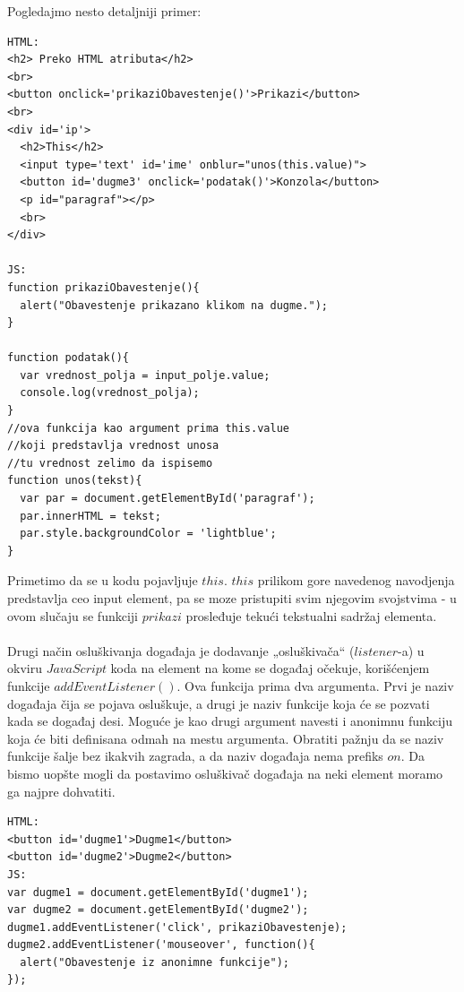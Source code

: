  
Pogledajmo nesto detaljniji primer:
\begin{lstlisting}[backgroundcolor = \color{lightgray}, breaklines=true]
HTML:
<h2> Preko HTML atributa</h2>
<br>
<button onclick='prikaziObavestenje()'>Prikazi</button>
<br>
<div id='ip'>
  <h2>This</h2>
  <input type='text' id='ime' onblur="unos(this.value)">
  <button id='dugme3' onclick='podatak()'>Konzola</button>
  <p id="paragraf"></p>
  <br>
</div>

JS:
function prikaziObavestenje(){
  alert("Obavestenje prikazano klikom na dugme.");
}

function podatak(){
  var vrednost_polja = input_polje.value;
  console.log(vrednost_polja);    
}
//ova funkcija kao argument prima this.value 
//koji predstavlja vrednost unosa
//tu vrednost zelimo da ispisemo
function unos(tekst){
  var par = document.getElementById('paragraf');
  par.innerHTML = tekst;
  par.style.backgroundColor = 'lightblue';
}           
\end{lstlisting} 

Primetimo da se u kodu pojavljuje $this$. $this$ prilikom gore navedenog navodjenja predstavlja ceo input element, pa se moze pristupiti svim njegovim svojstvima - u ovom slučaju se funkciji $prikazi$ prosleđuje tekući tekstualni sadržaj elementa.\\\\

Drugi način osluškivanja događaja je dodavanje „osluškivača“ ($listener$-a) u okviru
$JavaScript$ koda na element na kome se događaj očekuje, korišćenjem funkcije
$addEventListener()$. Ova funkcija prima dva argumenta. Prvi je naziv događaja čija se
pojava osluškuje, a drugi je naziv funkcije koja će se pozvati kada se događaj desi. Moguće je kao drugi argument navesti i anonimnu funkciju koja će biti definisana odmah na mestu argumenta. Obratiti pažnju da se naziv funkcije šalje bez ikakvih zagrada, a da naziv događaja nema prefiks $on$. Da bismo uopšte mogli da postavimo osluškivač događaja na neki element moramo ga najpre dohvatiti.
\begin{lstlisting}[backgroundcolor = \color{lightgray}, breaklines=true]
HTML:
<button id='dugme1'>Dugme1</button>
<button id='dugme2'>Dugme2</button>
JS:
var dugme1 = document.getElementById('dugme1');
var dugme2 = document.getElementById('dugme2');
dugme1.addEventListener('click', prikaziObavestenje);
dugme2.addEventListener('mouseover', function(){
  alert("Obavestenje iz anonimne funkcije");
});
\end{lstlisting}

